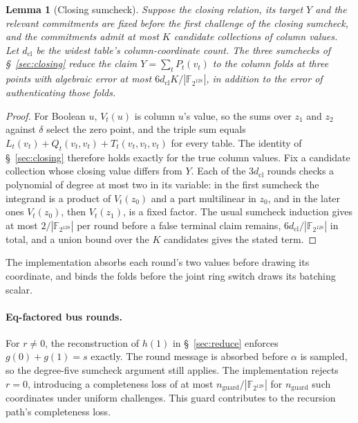\documentclass[11pt]{article}
\newtheorem{lemma}{Lemma}
\newcommand{\F}{\mathbb{F}_{2^{128}}}
\begin{document}
\begin{lemma}[Closing sumcheck]\label{lem:closing}
Suppose the closing relation, its target $Y$ and the relevant commitments are
fixed before the first challenge of the closing sumcheck, and the commitments
admit at most $K$ candidate collections of column values. Let $d_{\mathrm{cl}}$ be the widest table's column-coordinate count. The three sumchecks of
\S~\ref{sec:closing} reduce the claim $Y=\sum_tP_t(v_t)$ to the column folds
at three points with algebraic error at most $6d_{\mathrm{cl}}K/|\F|$, in addition to the
error of authenticating those folds.
\end{lemma}
\begin{proof}
For Boolean $u$, $V_t(u)$ is column $u$'s value, so the sums over $z_1$ and
$z_2$ against $\delta$ select the zero point, and the triple sum equals
$L_t(v_t)+Q_t(v_t,v_t)+T_t(v_t,v_t,v_t)$ for every table. The identity of
\S~\ref{sec:closing} therefore holds exactly for the true column values. Fix
a candidate collection whose closing value differs from $Y$. Each of the
$3d_{\mathrm{cl}}$ rounds checks a polynomial of degree at most two in its variable: in
the first sumcheck the integrand is a product of $V_t(z_0)$ and a part
multilinear in $z_0$, and in the later ones $V_t(z_0)$, then $V_t(z_1)$, is a
fixed factor. The usual sumcheck induction gives at most $2/|\F|$ per round
before a false terminal claim remains, $6d_{\mathrm{cl}}/|\F|$ in total, and a union bound
over the $K$ candidates gives the stated term.
\end{proof}
The implementation absorbs each round's two values before drawing its
coordinate, and binds the folds before the joint ring switch draws its
batching scalar.

\paragraph{Eq-factored bus rounds.}
For $r\ne0$, the reconstruction of $h(1)$ in \S~\ref{sec:reduce} enforces
$g(0)+g(1)=s$ exactly. The round message is absorbed before $\alpha$ is
sampled, so the degree-five sumcheck argument still applies. The implementation rejects $r=0$, introducing a completeness
loss of at most $n_{\mathrm{guard}}/|\F|$ for $n_{\mathrm{guard}}$ such coordinates under uniform challenges.
This guard contributes to the recursion path's completeness loss.
\end{document}
